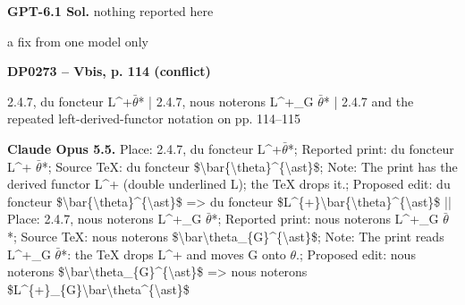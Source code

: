 \textbf{GPT-6.1 Sol.} nothing reported here\par
a fix from one model only\par
\par\noindent\hypertarget{DP0273}{}\textbf{DP0273 -- Vbis, p. 114 (conflict)}\par
2.4.7, du foncteur L\textasciicircum{}+\ensuremath{\bar{\theta}}* | 2.4.7, nous noterons L\textasciicircum{}+\_G \ensuremath{\bar{\theta}}* | 2.4.7 and the repeated left-derived-functor notation on pp. 114–115\par
\textbf{Claude Opus 5.5.} Place: 2.4.7, du foncteur L\textasciicircum{}+\ensuremath{\bar{\theta}}*; Reported print: du foncteur L\textasciicircum{}+ \ensuremath{\bar{\theta}}*; Source TeX: du foncteur \$\textbackslash{}bar\{\textbackslash{}theta\}\textasciicircum{}\{\textbackslash{}ast\}\$; Note: The print has the derived functor L\textasciicircum{}+ (double underlined L); the TeX drops it.; Proposed edit: du foncteur \$\textbackslash{}bar\{\textbackslash{}theta\}\textasciicircum{}\{\textbackslash{}ast\}\$ =\allowbreak > du foncteur \$L\textasciicircum{}\{+\}\textbackslash{}bar\{\textbackslash{}theta\}\textasciicircum{}\{\textbackslash{}ast\}\$ || Place: 2.4.7, nous noterons L\textasciicircum{}+\_G \ensuremath{\bar{\theta}}*; Reported print: nous noterons L\textasciicircum{}+\_G \ensuremath{\bar{\theta}}*; Source TeX: nous noterons \$\textbackslash{}bar\textbackslash{}theta\_\{G\}\textasciicircum{}\{\textbackslash{}ast\}\$; Note: The print reads L\textasciicircum{}+\_G \ensuremath{\bar{\theta}}*: the TeX drops L\textasciicircum{}+ and moves G onto \ensuremath{\theta}.; Proposed edit: nous noterons \$\textbackslash{}bar\textbackslash{}theta\_\{G\}\textasciicircum{}\{\textbackslash{}ast\}\$ =\allowbreak > nous noterons \$L\textasciicircum{}\{+\}\_\{G\}\textbackslash{}bar\textbackslash{}theta\textasciicircum{}\{\textbackslash{}ast\}\$\par
